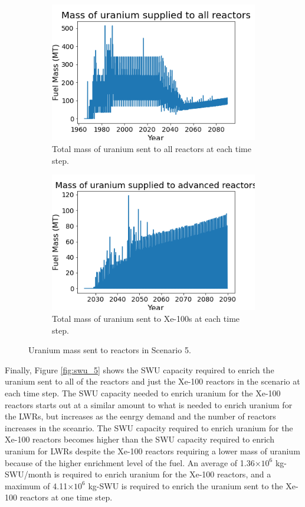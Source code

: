 \begin{figure}
    \centering
    \begin{subfigure}{0.4\textwidth}
        \centering
        \includegraphics[scale=0.3]{figures/fuelsupply_scenarios_5.png}
        \caption{Total mass of uranium sent to all reactors at each time step.}
        \label{fig:totalfuel_5}
    \end{subfigure}
    \begin{subfigure}{0.4\textwidth}
        \centering
        \includegraphics[scale=0.3]{figures/advancedRX_fuelsupply_scenarios_5.png}
        \caption{Total mass of uranium sent to Xe-100s at each time step.}
        \label{fig:haleu_5}
    \end{subfigure}
    \caption{Uranium mass sent to reactors in Scenario 5.}
    \label{fig:fuel_5}
\end{figure}

Finally, Figure \ref{fig:swu_5} shows the \gls{SWU} capacity required
to enrich the uranium sent to all of the reactors and just the Xe-100
reactors in the scenario at each time step. The \gls{SWU} capacity needed 
to enrich uranium for the Xe-100 reactors starts out at a similar 
amount to what is needed to enrich uranium for the \glspl{LWR}, but 
increases as the eenrgy demand and the number of reactors increases 
in the sceanrio. The \gls{SWU} capacity required to enrich uranium 
for the Xe-100 reactors becomes higher than the \gls{SWU} capacity 
required to enrich uranium for \glspl{LWR} despite the Xe-100 
reactors requiring a lower mass of uranium because of the higher 
enrichment level of the fuel. An average of 1.36$\times 10^6$ 
kg-\gls{SWU}/month is required 
to enrich uranium for the Xe-100 reactors, and a maximum of 
4.11$\times 10^6$ kg-\gls{SWU} is required to enrich the uranium sent to the 
Xe-100 reactors at one time step. 

